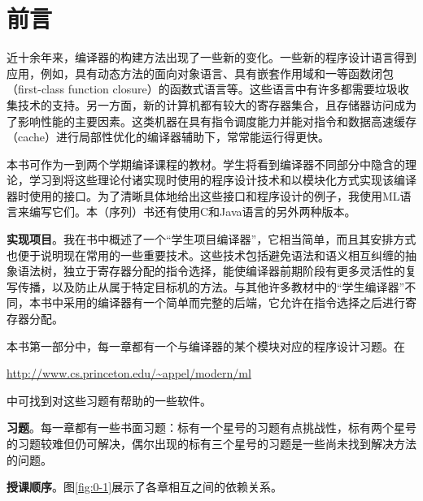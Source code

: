 \documentclass[cn,11pt,chinese]{elegantbook}
\begin{document}
\tableofcontents

\mainmatter

\chapter*{前言}

近十余年来，编译器的构建方法出现了一些新的变化。一些新的程序设计语言得到应用，例如，具有动态方法的面向对象语言、具有嵌套作用域和一等函数闭包（first-class function closure）的函数式语言等。这些语言中有许多都需要垃圾收集技术的支持。另一方面，新的计算机都有较大的寄存器集合，且存储器访问成为了影响性能的主要因素。这类机器在具有指令调度能力并能对指令和数据高速缓存（cache）进行局部性优化的编译器辅助下，常常能运行得更快。

本书可作为一到两个学期编译课程的教材。学生将看到编译器不同部分中隐含的理论，学习到将这些理论付诸实现时使用的程序设计技术和以模块化方式实现该编译器时使用的接口。为了清晰具体地给出这些接口和程序设计的例子，我使用ML语言来编写它们。本（序列）书还有使用C和Java语言的另外两种版本。

\textbf{实现项目}。我在书中概述了一个“学生项目编译器”，它相当简单，而且其安排方式也便于说明现在常用的一些重要技术。这些技术包括避免语法和语义相互纠缠的抽象语法树，独立于寄存器分配的指令选择，能使编译器前期阶段有更多灵活性的复写传播，以及防止从属于特定目标机的方法。与其他许多教材中的“学生编译器”不同，本书中采用的编译器有一个简单而完整的后端，它允许在指令选择之后进行寄存器分配。

本书第一部分中，每一章都有一个与编译器的某个模块对应的程序设计习题。在

\href{http://www.cs.princeton.edu/\textasciitilde appel/modern/ml}{http://www.cs.princeton.edu/\textasciitilde appel/modern/ml}

中可找到对这些习题有帮助的一些软件。

\textbf{习题}。每一章都有一些书面习题：标有一个星号的习题有点挑战性，标有两个星号的习题较难但仍可解决，偶尔出现的标有三个星号的习题是一些尚未找到解决方法的问题。

\textbf{授课顺序}。图\ref{fig:0-1}展示了各章相互之间的依赖关系。
\end{document}
